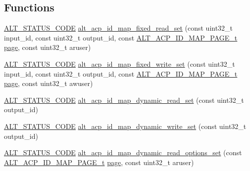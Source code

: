 \subsection*{Functions}
\begin{DoxyCompactItemize}
\item 
\mbox{\hyperlink{hwlib_8h_abdb0d369f069723ca55d6c94bcaaaa12}{A\+L\+T\+\_\+\+S\+T\+A\+T\+U\+S\+\_\+\+C\+O\+DE}} \mbox{\hyperlink{group__ADDR__SPACE__MGR__MEM__COHERENCE_ga0fc0b37fb8894197cdb051fd0b072f4b}{alt\+\_\+acp\+\_\+id\+\_\+map\+\_\+fixed\+\_\+read\+\_\+set}} (const uint32\+\_\+t input\+\_\+id, const uint32\+\_\+t output\+\_\+id, const \mbox{\hyperlink{group__ADDR__SPACE__MGR__MEM__COHERENCE_ga76f004ab7bdcd5ccff68cf02fb9e5f5d}{A\+L\+T\+\_\+\+A\+C\+P\+\_\+\+I\+D\+\_\+\+M\+A\+P\+\_\+\+P\+A\+G\+E\+\_\+t}} \mbox{\hyperlink{structpage}{page}}, const uint32\+\_\+t aruser)
\item 
\mbox{\hyperlink{hwlib_8h_abdb0d369f069723ca55d6c94bcaaaa12}{A\+L\+T\+\_\+\+S\+T\+A\+T\+U\+S\+\_\+\+C\+O\+DE}} \mbox{\hyperlink{group__ADDR__SPACE__MGR__MEM__COHERENCE_ga132f9aeccaeac5bfe5622e387d64c770}{alt\+\_\+acp\+\_\+id\+\_\+map\+\_\+fixed\+\_\+write\+\_\+set}} (const uint32\+\_\+t input\+\_\+id, const uint32\+\_\+t output\+\_\+id, const \mbox{\hyperlink{group__ADDR__SPACE__MGR__MEM__COHERENCE_ga76f004ab7bdcd5ccff68cf02fb9e5f5d}{A\+L\+T\+\_\+\+A\+C\+P\+\_\+\+I\+D\+\_\+\+M\+A\+P\+\_\+\+P\+A\+G\+E\+\_\+t}} \mbox{\hyperlink{structpage}{page}}, const uint32\+\_\+t awuser)
\item 
\mbox{\hyperlink{hwlib_8h_abdb0d369f069723ca55d6c94bcaaaa12}{A\+L\+T\+\_\+\+S\+T\+A\+T\+U\+S\+\_\+\+C\+O\+DE}} \mbox{\hyperlink{group__ADDR__SPACE__MGR__MEM__COHERENCE_gac4940cb4c73770c4196363e9cfc15eda}{alt\+\_\+acp\+\_\+id\+\_\+map\+\_\+dynamic\+\_\+read\+\_\+set}} (const uint32\+\_\+t output\+\_\+id)
\item 
\mbox{\hyperlink{hwlib_8h_abdb0d369f069723ca55d6c94bcaaaa12}{A\+L\+T\+\_\+\+S\+T\+A\+T\+U\+S\+\_\+\+C\+O\+DE}} \mbox{\hyperlink{group__ADDR__SPACE__MGR__MEM__COHERENCE_ga3675b9b497121f9d270c557f2dcf052a}{alt\+\_\+acp\+\_\+id\+\_\+map\+\_\+dynamic\+\_\+write\+\_\+set}} (const uint32\+\_\+t output\+\_\+id)
\item 
\mbox{\hyperlink{hwlib_8h_abdb0d369f069723ca55d6c94bcaaaa12}{A\+L\+T\+\_\+\+S\+T\+A\+T\+U\+S\+\_\+\+C\+O\+DE}} \mbox{\hyperlink{group__ADDR__SPACE__MGR__MEM__COHERENCE_ga0d51894c7e3f60ecf9ad7bbb0329fb3f}{alt\+\_\+acp\+\_\+id\+\_\+map\+\_\+dynamic\+\_\+read\+\_\+options\+\_\+set}} (const \mbox{\hyperlink{group__ADDR__SPACE__MGR__MEM__COHERENCE_ga76f004ab7bdcd5ccff68cf02fb9e5f5d}{A\+L\+T\+\_\+\+A\+C\+P\+\_\+\+I\+D\+\_\+\+M\+A\+P\+\_\+\+P\+A\+G\+E\+\_\+t}} \mbox{\hyperlink{structpage}{page}}, const uint32\+\_\+t aruser)

\end{DoxyCompactItemize}
